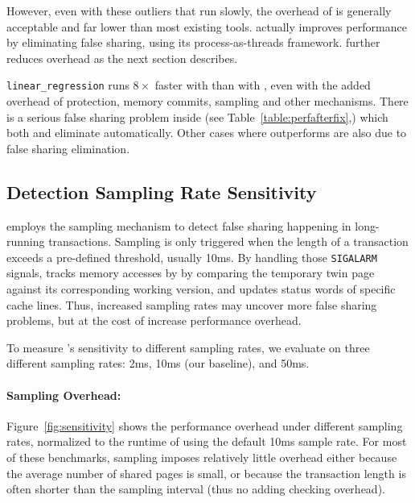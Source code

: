  
However, even with these outliers that run slowly, the overhead of \SheriffDetect{} is generally acceptable
and far lower than most existing tools. \SheriffDetect{} actually improves performance by eliminating false sharing, using its process-as-threads framework. \SheriffProtect{} further reduces overhead as the next section describes.

\texttt{linear\_regression} runs $8\times$ faster with \SheriffDetect{} than with \pthreads{}, even with the added overhead of protection, memory commits, sampling and 
other mechanisms.  There is a serious false sharing problem inside (see Table~\ref{table:perfafterfix},) which both \sheriffdetect{} and \sheriffprotect{} eliminate automatically. Other cases where \sheriffdetect{}
outperforms \pthreads{} are also due to false sharing elimination. 


\subsection{Detection Sampling Rate Sensitivity}
\label{sec:results-sampling-overhead}

\SheriffDetect{} employs the sampling mechanism to detect false sharing happening in long-running transactions. Sampling is only triggered when the length of a transaction exceeds a pre-defined threshold, usually 10ms. By handling those \texttt{SIGALARM} signals, \SheriffDetect{} tracks memory accesses by by comparing the temporary twin page against its
corresponding working version, and updates status words of specific cache lines. Thus, increased sampling rates may uncover more false sharing problems, but at the cost of increase performance overhead. 

To measure \sheriffdetect{}'s sensitivity to different sampling rates, we evaluate on three different sampling rates: 2ms, 10ms (our baseline), and 50ms.

\paragraph{Sampling Overhead:} Figure~\ref{fig:sensitivity} shows the performance overhead under different sampling rates, normalized to the runtime of using the default 10ms sample rate. For most of these benchmarks, sampling imposes relatively little overhead either because the average
number of shared pages is small, or because the
transaction length is often shorter than the sampling interval (thus no adding checking overhead).

